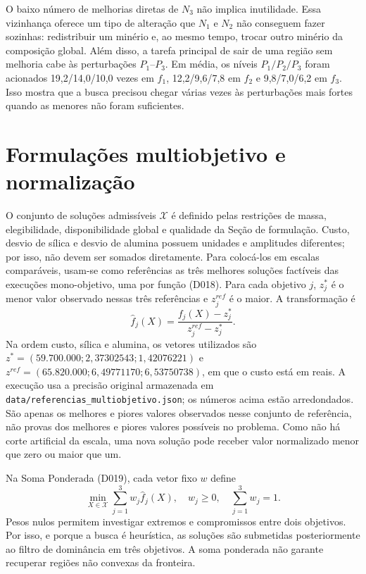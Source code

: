 \documentclass[10pt,twocolumn,a4paper]{article}
\begin{document}
O baixo número de melhorias diretas de $N_3$ não implica inutilidade. Essa vizinhança oferece um tipo de alteração que $N_1$ e $N_2$ não conseguem fazer sozinhas: redistribuir um minério e, ao mesmo tempo, trocar outro minério da composição global. Além disso, a tarefa principal de sair de uma região sem melhoria cabe às perturbações $P_1$--$P_3$. Em média, os níveis $P_1/P_2/P_3$ foram acionados 19,2/14,0/10,0 vezes em $f_1$, 12,2/9,6/7,8 em $f_2$ e 9,8/7,0/6,2 em $f_3$. Isso mostra que a busca precisou chegar várias vezes às perturbações mais fortes quando as menores não foram suficientes.

\section{Formulações multiobjetivo e normalização}

O conjunto de soluções admissíveis $\mathcal{X}$ é definido pelas restrições de massa, elegibilidade, disponibilidade global e qualidade da Seção de formulação. Custo, desvio de sílica e desvio de alumina possuem unidades e amplitudes diferentes; por isso, não devem ser somados diretamente. Para colocá-los em escalas comparáveis, usam-se como referências as três melhores soluções factíveis das execuções mono-objetivo, uma por função (D018). Para cada objetivo $j$, $z_j^*$ é o menor valor observado nessas três referências e $z_j^{ref}$ é o maior. A transformação é
\begin{equation}
\hat f_j(X) = \frac{f_j(X)-z_j^*}{z_j^{ref}-z_j^*}.
\end{equation}
Na ordem custo, sílica e alumina, os vetores utilizados são $z^*=(59.700.000; 2{,}37302543; 1{,}42076221)$ e $z^{ref}=(65.820.000; 6{,}49771170; 6{,}53750738)$, em que o custo está em reais. A execução usa a precisão original armazenada em \texttt{data/referencias\_multiobjetivo.json}; os números acima estão arredondados. São apenas os melhores e piores valores observados nesse conjunto de referência, não provas dos melhores e piores valores possíveis no problema. Como não há corte artificial da escala, uma nova solução pode receber valor normalizado menor que zero ou maior que um.

Na Soma Ponderada (D019), cada vetor fixo $w$ define
\begin{equation}
\min_{X\in\mathcal{X}} \sum_{j=1}^{3} w_j\hat f_j(X),
\quad w_j\geq 0,\quad \sum_{j=1}^{3}w_j=1.
\end{equation}
Pesos nulos permitem investigar extremos e compromissos entre dois objetivos. Por isso, e porque a busca é heurística, as soluções são submetidas posteriormente ao filtro de dominância em três objetivos. A soma ponderada não garante recuperar regiões não convexas da fronteira.
\end{document}

